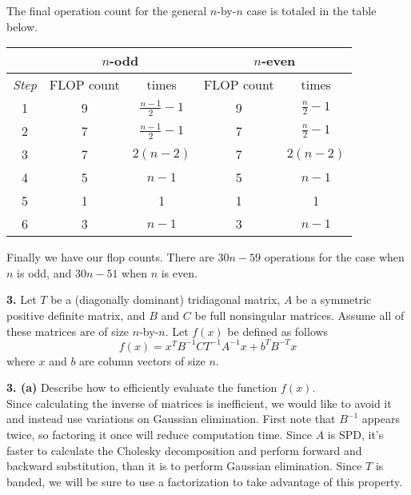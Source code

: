 \documentclass[12pt]{article}
\newcommand{\problem}[1]{\hspace{-4 ex} \large \textbf{#1}}
\begin{document}
	The final operation count for the general $n$-by-$n$ case is totaled in the table below.
	\begin{center}
		\begin{tabular}{|c|c|c|c|c|}\hline
			&\multicolumn{2}{|c|}{$n$-odd}&\multicolumn{2}{|c|}{$n$-even} \\ \hline
			\emph{Step}&FLOP count&times&FLOP count&times \\ \hline
			1 &9 & $\tfrac{n-1}{2}-1$ &9 & $\tfrac{n}{2}-1$ \\ \hline
			2 &7 & $\tfrac{n-1}{2}-1$ &7 & $\tfrac{n}{2}-1$ \\ \hline
			3 &7 & $2(n-2)$ &7 & $2(n-2)$ \\ \hline
			4 &5 & $n-1$ &5 & $n-1$ \\ \hline
			5 &1 & 1 &1 & 1 \\ \hline
			6 &3 & $n-1$ &3 & $n-1$ \\ \hline
		\end{tabular}
	\end{center}
	Finally we have our flop counts. There are $30n-59$ operations for the case when $n$ is odd, and $30n-51$ when $n$ is even.	\bigbreak
	
\problem{3.} Let $T$ be a (diagonally dominant) tridiagonal matrix, $A$ be a symmetric positive definite matrix, and $B$ and $C$ be full nonsingular matrices. Assume all of these matrices are of size $n$-by-$n$. Let $f(x)$ be defined as follows $$f(x) = x^TB^{-1}CT^{-1}A^{-1}x + b^TB^{-T}x$$ where $x$ and $b$ are column vectors of size $n$.

\problem{3. (a)} Describe how to efficiently evaluate the function $f(x)$. \\

	Since calculating the inverse of matrices is inefficient, we would like to avoid it and instead use variations on Gaussian elimination. First note that $B^{-1}$ appears twice, so factoring it once will reduce computation time. Since $A$ is SPD, it's faster to calculate the Cholesky decomposition and perform forward and backward substitution, than it is to perform Gaussian elimination. Since $T$ is banded, we will be sure to use a factorization to take advantage of this property. \bigbreak
	
\end{document}
